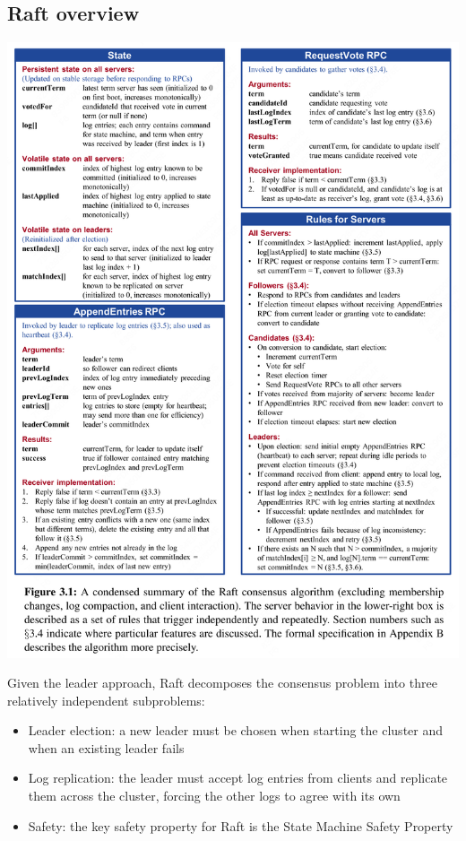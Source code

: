 \documentclass[11pt]{article}
\begin{document}
\subsection{Raft overview}
\label{sec:org6eee8cb}
\begin{center}
\includegraphics[width=.99\textwidth]{../../images/papers/17.png}
\label{}
\end{center}
Given the leader approach, Raft decomposes the consensus problem into three relatively independent
subproblems:
\begin{itemize}
\item Leader election: a new leader must be chosen when starting the cluster and when an existing leader fails
\item Log replication: the leader must accept log entries from clients and replicate them across the cluster, forcing the other logs to agree with its own
\item Safety: the key safety property for Raft is the State Machine Safety Property
\end{itemize}
\end{document}
